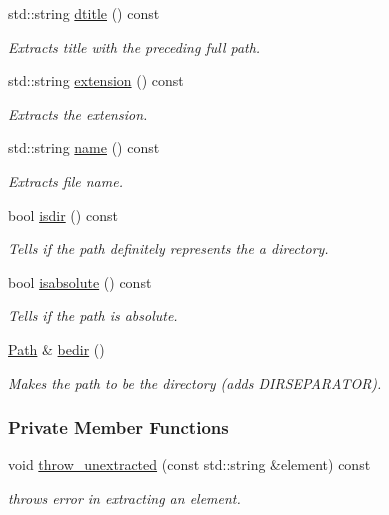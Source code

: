 \begin{DoxyCompactItemize}
std::string \hyperlink{classPath_a564754a82c5c20d189409ba44ceea86b}{dtitle} () const 
\begin{DoxyCompactList}\small\item\em Extracts title with the preceding full path. \item\end{DoxyCompactList}\item 
std::string \hyperlink{classPath_a7f2657c21893cc8158c6deab5edcf2d1}{extension} () const 
\begin{DoxyCompactList}\small\item\em Extracts the extension. \item\end{DoxyCompactList}\item 
std::string \hyperlink{classPath_aff986368d9ba09541e2823e452bf4ae2}{name} () const 
\begin{DoxyCompactList}\small\item\em Extracts file name. \item\end{DoxyCompactList}\item 
bool \hyperlink{classPath_ab601d3934286745a61b197e4601c1e32}{isdir} () const 
\begin{DoxyCompactList}\small\item\em Tells if the path definitely represents the a directory. \item\end{DoxyCompactList}\item 
bool \hyperlink{classPath_a19c63487e42238c70502464542553c67}{isabsolute} () const 
\begin{DoxyCompactList}\small\item\em Tells if the path is absolute. \item\end{DoxyCompactList}\item 
\hyperlink{classPath}{Path} \& \hyperlink{classPath_aa209169977f4d0866658e2d340dcc6af}{bedir} ()
\begin{DoxyCompactList}\small\item\em Makes the path to be the directory (adds DIRSEPARATOR). \item\end{DoxyCompactList}\end{DoxyCompactItemize}
\subsubsection*{Private Member Functions}
\begin{DoxyCompactItemize}
\item 
void \hyperlink{classPath_a2a1232aebba532d6b2f728dd2d478a76}{throw\_\-unextracted} (const std::string \&element) const 
\begin{DoxyCompactList}\small\item\em throws error in extracting an element. \item\end{DoxyCompactList}\end{DoxyCompactItemize}
